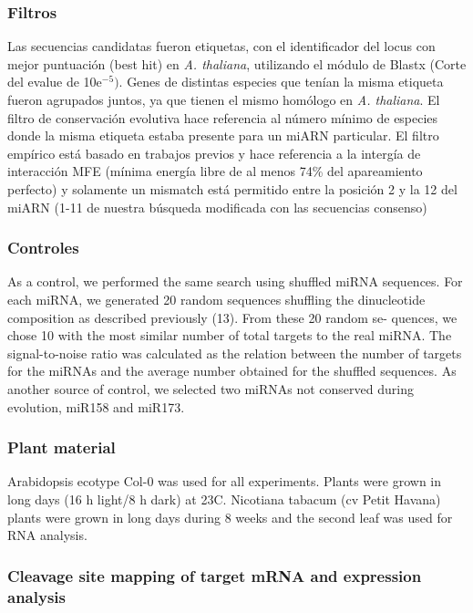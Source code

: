 \subsubsection{Filtros}
Las secuencias candidatas fueron etiquetas, con el identificador del locus con mejor puntuación (best hit) en \textit{A. thaliana}, utilizando el módulo de Blastx (Corte del evalue de 10e$^{-5})$.
Genes de distintas especies que tenían la misma etiqueta fueron agrupados juntos, ya que tienen el mismo homólogo en \textit{A. thaliana}.
El filtro de conservación evolutiva hace referencia al número mínimo de especies donde la misma etiqueta estaba presente para un miARN particular.
El filtro empírico está basado en trabajos previos\citep{38} y hace referencia a la intergía de interacción MFE (mínima energía libre de al menos 74\% del apareamiento perfecto) y solamente un mismatch está permitido entre la posición 2 y la 12 del miARN (1-11 de nuestra búsqueda modificada con las secuencias consenso)

\subsubsection{Controles}
As a control, we performed the same search using shuffled
miRNA sequences. For each miRNA, we generated 20
random sequences shuffling the dinucleotide composition
as described previously (13). From these 20 random se-
quences, we chose 10 with the most similar number of
total targets to the real miRNA. The signal-to-noise
ratio was calculated as the relation between the number
of targets for the miRNAs and the average number
obtained for the shuffled sequences. As another source
of control, we selected two miRNAs not conserved
during evolution, miR158 and miR173.



\subsubsection{Plant material}
Arabidopsis ecotype Col-0 was used for all experiments.
Plants were grown in long days (16 h light/8 h dark) at
23C. Nicotiana tabacum (cv Petit Havana) plants were
grown in long days during 8 weeks and the second leaf
was used for RNA analysis.

\subsubsection{Cleavage site mapping of target mRNA and expression analysis}

